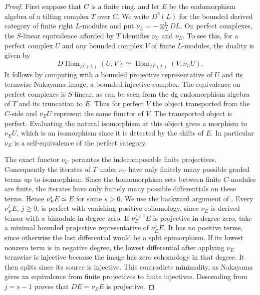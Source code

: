 \documentclass[12pt,a4paper,english,reqno]{amsart}
\numberwithin{equation}{section}
\theoremstyle{plain}
\theoremstyle{definition}
\begin{document}
\begin{proof}
First suppose that $C$ is a finite ring, and let $E$ be the
endomorphism algebra of a tilting complex $T$ over $C$. We write
$D^b(L)$ for the bounded derived category of finite right
$L$-modules and put $\nu_L=-\otimes_L^{\mathbf L}DL$. On perfect complexes, the
$S$-linear equivalence afforded by $T$ identifies $\nu_C$ and
$\nu_E$. To see this, for a perfect complex $U$ and any bounded
complex $V$ of finite $L$-modules, the duality is given by
\[
 D\operatorname{Hom}_{D^b(L)}(U,V)
       \simeq\operatorname{Hom}_{D^b(L)}(V,\nu_L U).
\]
It follows by computing with a bounded projective representative of
$U$ and its termwise Nakayama image, a bounded injective complex.
The equivalence on perfect complexes is $S$-linear, as can be
seen from the dg endomorphism algebra of $T$ and its truncation
to $E$. Thus for perfect $V$ the object transported from the
$C$-side and $\nu_E U$ represent the same functor of $V$.
The transported object is perfect. Evaluating the natural
isomorphism at this object gives a morphism to $\nu_E U$,
which is an isomorphism since it is detected by the shifts of $E$.
In particular $\nu_E$ is a self-equivalence of the perfect
category.

The exact functor $\nu_C$ permutes the indecomposable finite
projectives. Consequently the iterates of $T$ under $\nu_C$ have
only finitely many possible graded terms up to isomorphism.
Since the homomorphism sets between finite $C$-modules are finite,
the iterates have only finitely many possible differentials on
these terms. Hence $\nu_E^s E\simeq E$ for some $s>0$.
We use the backward argument of
\cite[Theorem~2.1]{AlNofayeeRickard2013}.
Every $\nu_E^j E$, $j\geq0$, is perfect with vanishing positive
cohomology, since $\nu_E$ is derived tensor with a bimodule in
degree zero. If $\nu_E^{j+1} E$ is projective in degree zero,
take a minimal bounded projective representative of $\nu_E^j E$.
It has no positive terms, since otherwise the last differential
would be a split epimorphism. If its lowest nonzero term is in
negative degree, the lowest differential after applying $\nu_E$
termwise is injective because the image has zero cohomology
in that degree. It then splits since its source is injective.
This contradicts minimality, as Nakayama gives an equivalence
from finite projectives to finite injectives. Descending from
$j=s-1$ proves that $DE=\nu_E E$ is projective.


\end{proof}
\end{document}
